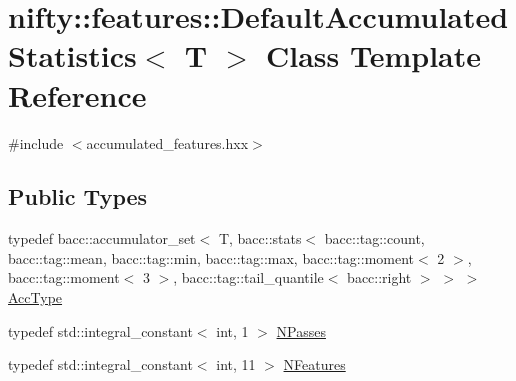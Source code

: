 \hypertarget{classnifty_1_1features_1_1DefaultAccumulatedStatistics}{}\section{nifty\+:\+:features\+:\+:Default\+Accumulated\+Statistics$<$ T $>$ Class Template Reference}
\label{classnifty_1_1features_1_1DefaultAccumulatedStatistics}


{\ttfamily \#include $<$accumulated\+\_\+features.\+hxx$>$}

\subsection*{Public Types}
\begin{DoxyCompactItemize}
\item 
typedef bacc\+::accumulator\+\_\+set$<$ T, bacc\+::stats$<$ bacc\+::tag\+::count, bacc\+::tag\+::mean, bacc\+::tag\+::min, bacc\+::tag\+::max, bacc\+::tag\+::moment$<$ 2 $>$, bacc\+::tag\+::moment$<$ 3 $>$, bacc\+::tag\+::tail\+\_\+quantile$<$ bacc\+::right $>$ $>$ $>$ \hyperlink{classnifty_1_1features_1_1DefaultAccumulatedStatistics_a1b5957732304d0ef906515d7229d8b7a}{Acc\+Type}
\item 
typedef std\+::integral\+\_\+constant$<$ int, 1 $>$ \hyperlink{classnifty_1_1features_1_1DefaultAccumulatedStatistics_a1cfd69b68fe90e8464d4bbea5929856e}{N\+Passes}
\item 
typedef std\+::integral\+\_\+constant$<$ int, 11 $>$ \hyperlink{classnifty_1_1features_1_1DefaultAccumulatedStatistics_acf47a025351ecf2d9427c10a2427c412}{N\+Features}
\end{DoxyCompactItemize}
